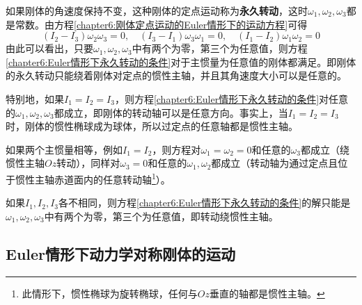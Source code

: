 如果刚体的角速度保持不变，这种刚体的定点运动称为{\bf 永久转动}，这时$\omega_1,\omega_2,\omega_3$都是常数。由方程\eqref{chapter6:刚体定点运动的Euler情形下的运动方程}可得
\begin{equation}
	(I_2-I_3)\omega_2\omega_3=0,\quad (I_3-I_1)\omega_3\omega_1=0,\quad (I_1-I_2)\omega_1\omega_2=0
	\label{chapter6:Euler情形下永久转动的条件}
\end{equation}
由此可以看出，只要$\omega_1,\omega_2,\omega_3$中有两个为零，第三个为任意值，则方程\eqref{chapter6:Euler情形下永久转动的条件}对于主惯量为任意值的刚体都满足。即刚体的永久转动只能绕着刚体对定点的惯性主轴，并且其角速度大小可以是任意的。

特别地，如果$I_1=I_2=I_3$，则方程\eqref{chapter6:Euler情形下永久转动的条件}对任意的$\omega_1,\omega_2,\omega_3$都成立，即刚体的转动轴可以是任意方向。事实上，当$I_1=I_2=I_3$时，刚体的惯性椭球成为球体，所以过定点的任意轴都是惯性主轴。

如果两个主惯量相等，例如$I_1=I_2$，则方程对$\omega_1=\omega_2=0$和任意的$\omega_3$都成立（绕惯性主轴$Oz$转动），同样对$\omega_3=0$和任意的$\omega_1,\omega_2$都成立（转动轴为通过定点且位于惯性主轴赤道面内的任意转动轴\footnote{此情形下，惯性椭球为旋转椭球，任何与$Oz$垂直的轴都是惯性主轴。}）。

如果$I_1,I_2,I_3$各不相同，则方程\eqref{chapter6:Euler情形下永久转动的条件}的解只能是$\omega_1,\omega_2,\omega_3$中有两个为零，第三个为任意值，即转动绕惯性主轴。

\subsection{Euler情形下动力学对称刚体的运动}\label{chapter6:subsection-Euler情形下动力学对称刚体的运动}

